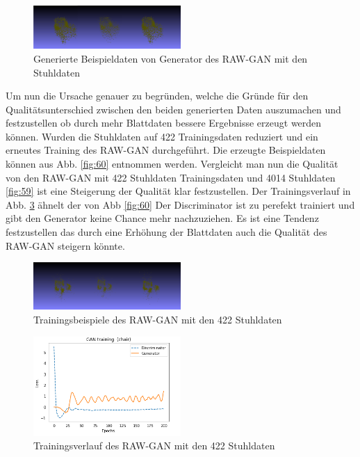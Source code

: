 \documentclass{llncs}
\begin{document}
\begin{figure}[htbp] 
	\centering
	\includegraphics[width=0.5\textwidth]{raw_gan_chair_example.png}
	\caption{Generierte Beispieldaten von Generator des RAW-GAN mit den Stuhldaten}
	\label{fig:Bild58}
\end{figure}

Um nun die Ursache genauer zu begründen, welche die Gründe für  den Qualitätsunterschied zwischen den beiden generierten Daten auszumachen und festzustellen ob durch mehr Blattdaten bessere Ergebnisse erzeugt werden können. Wurden  die Stuhldaten auf 422 Trainingsdaten reduziert und ein erneutes Training des RAW-GAN durchgeführt. Die erzeugte Beispieldaten können aus Abb. \ref{fig:60} entnommen werden. Vergleicht man nun die Qualität von den RAW-GAN mit 422 Stuhldaten Trainingsdaten und 
4014 Stuhldaten \ref{fig:59} ist eine Steigerung der Qualität klar festzustellen. Der Trainingsverlauf in Abb. \ref{fig:Bild59} ähnelt der von Abb \ref{fig:60} Der Discriminator ist zu perefekt trainiert und gibt den Generator keine Chance mehr nachzuziehen. Es ist eine Tendenz festzustellen das durch eine Erhöhung der Blattdaten auch die Qualität des RAW-GAN steigern könnte.

\begin{figure}[htbp] 
	\centering
	\includegraphics[width=0.5\textwidth]{raw_gan_result_400_result.png}
	\caption{Trainingsbeispiele des RAW-GAN mit den 422 Stuhldaten}
	\label{fig:Bild60}
\end{figure}

\begin{figure}[htbp] 
	\centering
	\includegraphics[width=0.5\textwidth]{raw_gan_result_400_examples.png}
	\caption{Trainingsverlauf des RAW-GAN mit den 422 Stuhldaten}
	\label{fig:Bild59}
\end{figure}
\end{document}
